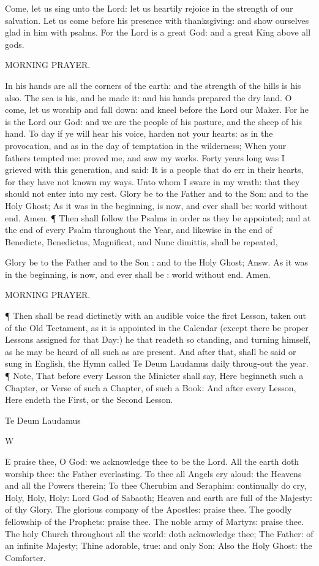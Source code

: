 Come, let us sing unto the Lord: let us heartily rejoice in the strength of our salvation. Let us come before his presence with thanksgiving: and show ourselves glad in him with psalms. For the Lord is a great God: and a great King above all gods.

MORNING PRAYER.

In his hands are all the corners of the earth: and the strength of the hills is his also. The sea is his, and he made it: and his hands prepared the dry land. O come, let us worship and fall down: and kneel before the Lord our Maker. For he is the Lord our God: and we are the people of his pasture, and the sheep of his hand. To day if ye will hear his voice, harden not your hearts: as in the provocation, and as in the day of temptation in the wilderness; When your fathers tempted me: proved me, and saw my works. Forty years long was I grieved with this generation, and said: It is a people that do err in their hearts, for they have not known my ways. Unto whom I sware in my wrath: that they should not enter into my rest. Glory be to the Father and to the Son: and to the Holy Ghost; As it was in the beginning, is now, and ever shall be: world without end. Amen. ¶ Then shall follow the Psalms in order as they be appointed; and at the end of every Psalm throughout the Year, and likewise in the end of Benedicte, Benedictus, Magnificat, and Nunc dimittis, shall be repeated,

Glory be to the Father and to the Son : and to the Holy Ghost; Answ. As it was in the beginning, is now, and ever shall be : world without end. Amen.

MORNING PRAYER.

¶ Then shall be read dictinctly with an audible voice the firct Lesson, taken out of the Old Tectament, as it is appointed in the Calendar (except there be proper Lessons assigned for that Day:) he that readeth so ctanding, and turning himself, as he may be heard of all such as are present. And after that, shall be said or sung in English, the Hymn called Te Deum Laudamus daily throug-out the year. ¶ Note, That before every Lesson the Minicter shall say, Here beginneth such a Chapter, or Verse of such a Chapter, of such a Book: And after every Lesson, Here endeth the First, or the Second Lesson.

Te Deum Laudamus

W

E praise thee, O God: we acknowledge thee to be the Lord. All the earth doth worship thee: the Father everlasting. To thee all Angels cry aloud: the Heavens and all the Powers therein; To thee Cherubim and Seraphim: continually do cry, Holy, Holy, Holy: Lord God of Sabaoth; Heaven and earth are full of the Majesty: of thy Glory. The glorious company of the Apostles: praise thee. The goodly fellowship of the Prophets: praise thee. The noble army of Martyrs: praise thee. The holy Church throughout all the world: doth acknowledge thee; The Father: of an infinite Majesty; Thine adorable, true: and only Son; Also the Holy Ghost: the Comforter.

